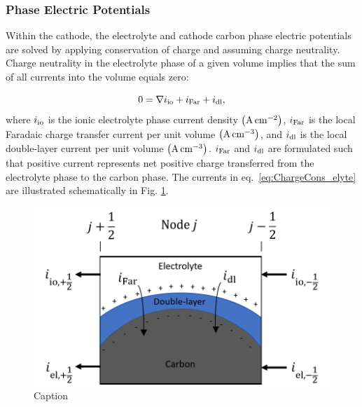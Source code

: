 \documentclass{elsarticle}
\begin{document}
\subsubsection{Phase Electric Potentials}
 Within the cathode, the electrolyte and cathode carbon phase electric potentials are solved by applying conservation of charge and assuming charge neutrality. Charge neutrality in the electrolyte phase of a given volume implies that the sum of all currents into the volume equals zero:

 \begin{equation}\label{eq:ChargeCons_elyte}
     0 = \nabla i_{\rm io} + i_{\rm Far} + i_{\rm dl},
 \end{equation}
where $i_{\rm io}$ is the ionic electrolyte phase current density ${\rm \left(A\,cm^{-2}\right)}$, $i_{\rm Far}$ is the local Faradaic charge transfer current per unit volume ${\rm \left(A\,cm^{-3}\right)}$, and $i_{\rm dl}$ is the local double-layer current per unit volume ${\rm \left(A\,cm^{-3}\right)}$.  $i_{\rm Far}$ and $i_{\rm dl}$ are formulated such that positive current represents net positive charge transferred from the electrolyte phase to the carbon phase. The currents in eq.~\ref{eq:ChargeCons_elyte} are illustrated schematically in Fig. \ref{fig:currentdiagram}. 

\begin{center}
\begin{figure}
    \centering
    \includegraphics[width=\textwidth/2]{CurrentDiagram.png}
    \caption{Caption}
    \label{fig:currentdiagram}
\end{figure}
\end{center}
\end{document}
